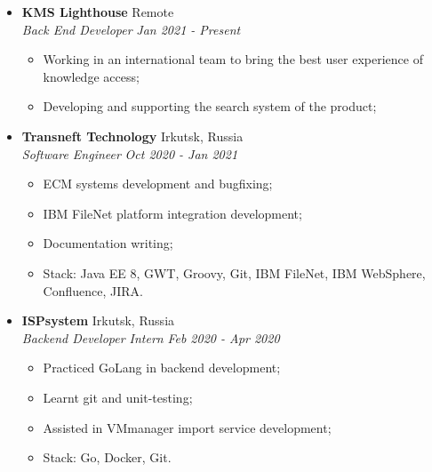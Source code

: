\documentclass[10pt]{article}
\begin{document}
\begin{itemize}[noitemsep,topsep=0pt]
    \item \normalsize{\textbf{KMS Lighthouse}} \normalsize{\hfill Remote 
    \\    \textit{ Back End Developer }
                                                                \hfill \textit{Jan 2021 - Present}}
            \begin{itemize}[itemsep=1pt,topsep=4pt] \normalsize
                \item {Working in an international team to bring the best user experience of knowledge access;}
                \item {Developing and supporting the search system of the product;}
            \end{itemize}

    \item \normalsize{\textbf{Transneft Technology}} \normalsize{\hfill Irkutsk, Russia 
    \\    \textit{ Software Engineer }
                                                                \hfill \textit{Oct 2020 - Jan 2021}}
            \begin{itemize}[itemsep=1pt,topsep=4pt] \normalsize
                \item {ECM systems development and bugfixing;}
                \item {IBM FileNet platform integration development;}
                \item {Documentation writing;}
                \item {Stack: Java EE 8, GWT, Groovy, Git, IBM FileNet, IBM WebSphere, Confluence, JIRA.}
            \end{itemize}
    \item \normalsize{\textbf{ISPsystem}} \normalsize{\hfill Irkutsk, Russia 
    \\    \textit{ Backend Developer Intern }
                                                                \hfill \textit{Feb 2020 - Apr 2020}}
            \begin{itemize}[itemsep=1pt,topsep=4pt] \normalsize
                \item {Practiced GoLang in backend development;}
                \item {Learnt git and unit-testing;}
                \item {Assisted in VMmanager import service development;}
                \item {Stack: Go, Docker, Git.}
            \end{itemize}
        \end{itemize}
\end{document}
